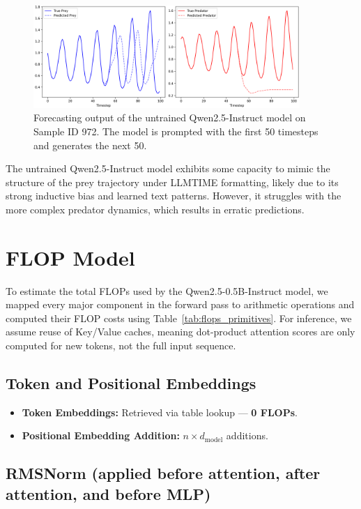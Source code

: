 \documentclass[a4paper,12pt]{article}
\begin{document}
  \begin{figure}[h]
      \centering
      \includegraphics[width=0.9\textwidth]{sample972_untrained.png}
      \caption{Forecasting output of the untrained Qwen2.5-Instruct model on Sample ID 972. The model is prompted with the first 50 timesteps and generates the next 50.}
      \label{fig:sample972_untrained}
  \end{figure}
  
  The untrained Qwen2.5-Instruct model exhibits some capacity to mimic the structure of the prey trajectory under LLMTIME formatting, likely due to its strong inductive bias and learned text patterns. However, it struggles with the more complex predator dynamics, which results in erratic predictions.
  
  \section{FLOP Model}

To estimate the total FLOPs used by the Qwen2.5-0.5B-Instruct model, we mapped every major component in the forward pass to arithmetic operations and computed their FLOP costs using Table~\ref{tab:flops_primitives}. For inference, we assume reuse of Key/Value caches, meaning dot-product attention scores are only computed for new tokens, not the full input sequence.

\subsection*{Token and Positional Embeddings}
\begin{itemize}
  \item \textbf{Token Embeddings:} Retrieved via table lookup — \textbf{0 FLOPs}.
  \item \textbf{Positional Embedding Addition:} $n \times d_{\text{model}}$ additions.
\end{itemize}

\subsection*{RMSNorm (applied before attention, after attention, and before MLP)}
\end{document}
